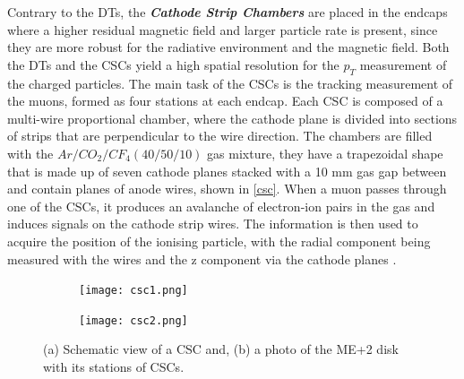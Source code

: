 Contrary to the DTs, the \emph{\textbf{Cathode Strip Chambers}} are placed in the endcaps where a higher residual magnetic field and larger particle rate is present, since they are more robust for the radiative environment and the magnetic field. Both the DTs and the CSCs yield a high spatial resolution for the $p_T$ measurement of the charged particles. The main task of the CSCs is the tracking measurement of the muons, formed as four stations at each endcap. Each CSC is composed of a multi-wire proportional chamber, where the cathode plane is divided into sections of strips that are perpendicular to the wire direction. The chambers are filled with the $Ar/CO_2/CF_4 (40/50/10)$ gas mixture, they have a trapezoidal shape that is made up of seven cathode planes stacked with a 10 mm gas gap between and contain planes of anode wires, shown in \autoref{csc}. When a muon passes through one of the CSCs, it produces an avalanche of electron-ion pairs in the gas and induces signals on the cathode strip wires. The information is then used to acquire the position of the ionising particle, with the radial component being measured with the wires and the z component via the cathode planes \cite{Sirunyan_2018}.

\begin{figure}[ht]
	\centering
	\begin{subfigure}[b]{0.475\textwidth}
		\centering
		\texttt{[image: csc1.png]}
		\vspace{-0.75cm}
		\label{csc1}
	\end{subfigure}
	\hspace{0.2cm}
	\begin{subfigure}[b]{0.475\textwidth}  
		\centering 
		\texttt{[image: csc2.png]}
		\vspace{-0.75cm}
		\label{csc2}
	\end{subfigure}
	\caption[Schematic view of a CSC (a) and a photo of the ME+2 disk with its stations of CSCs.]
	{\small (a) Schematic view of a CSC and, (b) a photo of the ME+2 disk with its stations of CSCs\cite{Acosta2008}.}
	\label{csc}
\end{figure}

